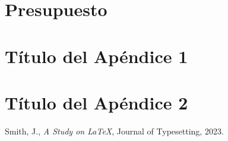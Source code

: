 \documentclass[spanish,a4paper,12pt,oneside]{extreport}
\begin{document}


\newpage{\pagestyle{empty}}
\thispagestyle{empty}

\chapter{\LARGE Presupuesto}
\label{chapter:presupuesto}



\newpage{\pagestyle{empty}\cleardoublepage}
\thispagestyle{empty}

\begin{appendix}

\chapter{\LARGE Título del Apéndice 1}
\label{appendix:1}


\chapter{\LARGE Título del Apéndice 2}
\label{appendix:2}


\end{appendix}


\begin{thebibliography}{X}
 Smith, J., \emph{A Study on LaTeX}, Journal of Typesetting, 2023.
\end{thebibliography}
\end{document}
